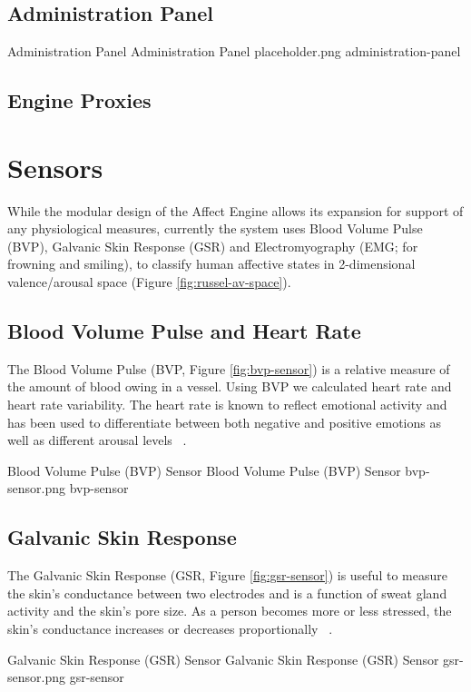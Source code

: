 \documentclass{uofsthesis-cs}
\begin{document}
\subsection{Administration Panel}

\img
{Administration Panel}
{Administration Panel}
{placeholder.png}
{administration-panel}

\subsection{Engine Proxies}


\section{Sensors}
While the modular design of the Affect Engine allows its expansion for support of any physiological measures, currently the system uses Blood Volume Pulse (BVP), Galvanic Skin Response (GSR) and Electromyography (EMG; for frowning and smiling), to classify human affective states in 2-dimensional valence/arousal space (Figure \ref{fig:russel-av-space}).

\subsection{Blood Volume Pulse and Heart Rate}
The Blood Volume Pulse (BVP, Figure \ref{fig:bvp-sensor}) is a relative measure of the amount of blood owing in a vessel. Using BVP we calculated heart rate and heart rate variability. The heart rate is known to reflect emotional activity and has been used to differentiate between both negative and positive emotions as well as different arousal levels ~\cite{tt2013procomp}.

\img
{Blood Volume Pulse (BVP) Sensor}
{Blood Volume Pulse (BVP) Sensor}
{bvp-sensor.png}
{bvp-sensor}

\subsection{Galvanic Skin Response}
The Galvanic Skin Response (GSR, Figure \ref{fig:gsr-sensor}) is useful to measure the skin's conductance between two electrodes and is a function of sweat gland activity and the skin's pore size. As a person becomes more or less stressed, the skin's conductance increases or decreases proportionally ~\cite{picard2003affective}.

\img
{Galvanic Skin Response (GSR) Sensor}
{Galvanic Skin Response (GSR) Sensor}
{gsr-sensor.png}
{gsr-sensor}
\end{document}
